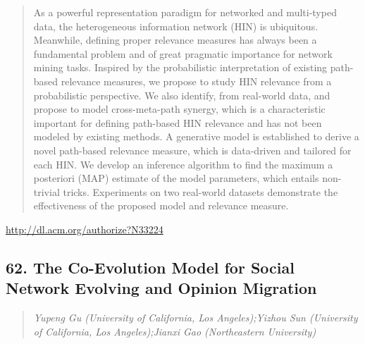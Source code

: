 \documentclass{article}
\begin{document}
\begin{quote}
As a powerful representation paradigm for networked and multi-typed data, the heterogeneous information network (HIN) is ubiquitous. Meanwhile, defining proper relevance measures has always been a fundamental problem and of great pragmatic importance for network mining tasks. Inspired by the probabilistic interpretation of existing path-based relevance measures, we propose to study HIN relevance from a probabilistic perspective. We also identify, from real-world data, and propose to model cross-meta-path synergy, which is a characteristic important for defining path-based HIN relevance and has not been modeled by existing methods. A generative model is established to derive a novel path-based relevance measure, which is data-driven and tailored for each HIN. We develop an inference algorithm to find the maximum a posteriori (MAP) estimate of the model parameters, which entails non-trivial tricks. Experiments on two real-world datasets demonstrate the effectiveness of the proposed model and relevance measure.
\end{quote}

\href{http://dl.acm.org/authorize?N33224}{http://dl.acm.org/authorize?N33224}

\subsection{62. The Co-Evolution Model for Social Network Evolving and Opinion Migration}

\begin{quote}
\footnotesize{\textit{Yupeng Gu (University of California, Los Angeles);Yizhou Sun (University of California, Los Angeles);Jianxi Gao (Northeastern University)}}

\end{quote}
\end{document}
